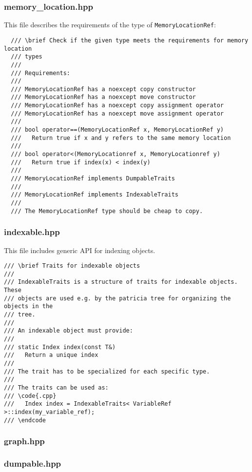\documentclass[12pt]{article}
\begin{document}
\subsubsection{memory\_location.hpp}
This file describes the requirements of the type of \texttt{MemoryLocationRef}:
\begin{lstlisting}
  /// \brief Check if the given type meets the requirements for memory location
  /// types
  ///
  /// Requirements:
  ///
  /// MemoryLocationRef has a noexcept copy constructor
  /// MemoryLocationRef has a noexcept move constructor
  /// MemoryLocationRef has a noexcept copy assignment operator
  /// MemoryLocationRef has a noexcept move assignment operator
  ///
  /// bool operator==(MemoryLocationRef x, MemoryLocationRef y)
  ///   Return true if x and y refers to the same memory location
  ///
  /// bool operator<(MemoryLocationref x, MemoryLocationref y)
  ///   Return true if index(x) < index(y)
  ///
  /// MemoryLocationRef implements DumpableTraits
  ///
  /// MemoryLocationRef implements IndexableTraits
  ///
  /// The MemoryLocationRef type should be cheap to copy.
\end{lstlisting}

\subsubsection{indexable.hpp}
This file includes generic API for indexing objects.
\begin{lstlisting}
/// \brief Traits for indexable objects
///
/// IndexableTraits is a structure of traits for indexable objects. These
/// objects are used e.g. by the patricia tree for organizing the objects in the
/// tree.
///
/// An indexable object must provide:
///
/// static Index index(const T&)
///   Return a unique index
///
/// The trait has to be specialized for each specific type.
///
/// The traits can be used as:
/// \code{.cpp}
///   Index index = IndexableTraits< VariableRef >::index(my_variable_ref);
/// \endcode
\end{lstlisting}

\subsubsection{graph.hpp}

\subsubsection{dumpable.hpp}
\end{document}

